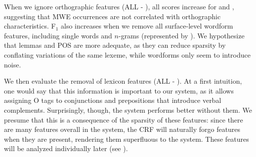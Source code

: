 \documentclass[output=paper,modfonts]{langscibook}
\begin{document}


When we ignore orthographic features ({\textsc ALL} - ), all scores increase for \devAQ{} and \devDD{}, suggesting that  MWE occurrences are not correlated with orthographic characteristics. F$_1$ also increases when we remove all surface-level wordform features, including single words and $n$-grams (represented by ). We hypothesize that  lemmas and POS are more adequate, as they can reduce sparsity by conflating variations of the same lexeme, while wordforms only seem to introduce noise.

We then evaluate the removal of lexicon features ({\textsc ALL} - ).
At a first intuition, one would say that this information is important to our system, as it allows assigning O tags to conjunctions and prepositions that introduce verbal complements. Surprisingly, though, the system performs better without them. 
We presume that this is a consequence of the sparsity of these features: since there are many features overall in the system, the CRF will naturally forgo  features when they are present, rendering them superfluous to the system. These features will be analyzed individually later (see ).
\end{document}
